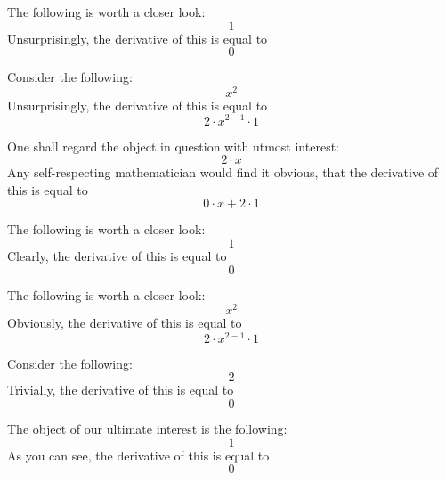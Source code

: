 \documentclass{article}
\begin{document}
The following is worth a closer look:
\begin{equation}
1 
\end{equation}
Unsurprisingly, the derivative of this is equal to
\begin{equation}
0 
\end{equation}

Consider the following:
\begin{equation}
x ^{2 } 
\end{equation}
Unsurprisingly, the derivative of this is equal to
\begin{equation}
2 \cdot x ^{2 - 1 } \cdot 1 
\end{equation}

One shall regard the object in question with utmost interest:
\begin{equation}
2 \cdot x 
\end{equation}
Any self-respecting mathematician would find it obvious, that the derivative of this is equal to
\begin{equation}
0 \cdot x + 2 \cdot 1 
\end{equation}

The following is worth a closer look:
\begin{equation}
1 
\end{equation}
Clearly, the derivative of this is equal to
\begin{equation}
0 
\end{equation}

The following is worth a closer look:
\begin{equation}
x ^{2 } 
\end{equation}
Obviously, the derivative of this is equal to
\begin{equation}
2 \cdot x ^{2 - 1 } \cdot 1 
\end{equation}

Consider the following:
\begin{equation}
2 
\end{equation}
Trivially, the derivative of this is equal to
\begin{equation}
0 
\end{equation}

The object of our ultimate interest is the following:
\begin{equation}
1 
\end{equation}
As you can see, the derivative of this is equal to
\begin{equation}
0 
\end{equation}
\end{document}

